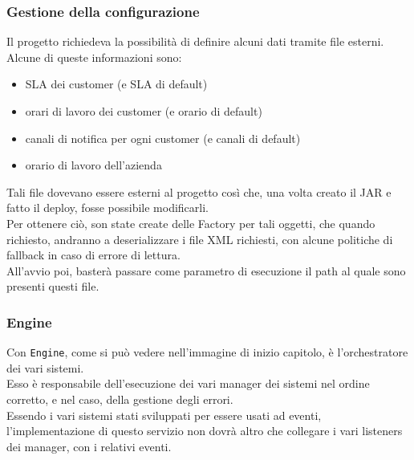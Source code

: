 		\subsubsection{Gestione della configurazione}
			Il progetto richiedeva la possibilità di definire alcuni dati tramite file esterni. \\
			Alcune di queste informazioni sono:
			\begin{itemize}
				\item SLA dei customer (e SLA di default)
				\item orari di lavoro dei customer (e orario di default)
				\item canali di notifica per ogni customer (e canali di default)
				\item orario di lavoro dell'azienda
			\end{itemize}
			Tali file dovevano essere esterni al progetto così che, una volta creato il JAR e fatto il deploy, fosse possibile modificarli.\\
			Per ottenere ciò, son state create delle Factory per tali oggetti, che quando richiesto, andranno a deserializzare i file XML richiesti, con alcune politiche di fallback in caso di errore di lettura. \\
			All'avvio poi, basterà passare come parametro di esecuzione il path al quale sono presenti questi file.\\
		\subsubsection{Engine}
			Con \texttt{Engine}, come si può vedere nell'immagine di inizio capitolo, è l'orchestratore dei vari sistemi. \\
			Esso è responsabile dell'esecuzione dei vari manager dei sistemi nel ordine corretto, e nel caso, della gestione degli errori. \\
			Essendo i vari sistemi stati sviluppati per essere usati ad eventi, l'implementazione di questo servizio non dovrà altro che collegare i vari listeners dei manager, con i relativi eventi. \\

